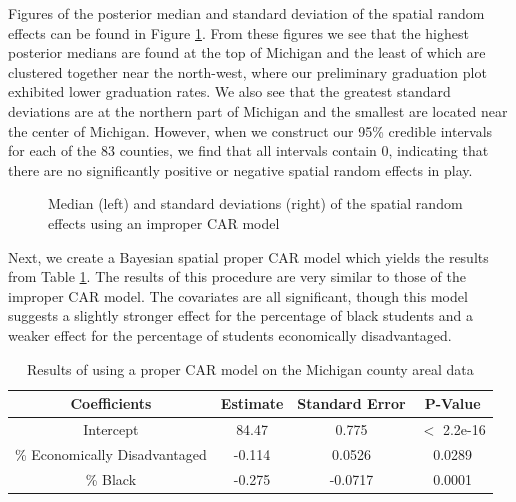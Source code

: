 \documentclass[12pt,letterpaper]{article}
\begin{document}
Figures of the posterior median and standard deviation of the spatial random effects can be found in Figure \ref{lab:med_sd}. From these figures we see that the highest posterior medians are found at the top of Michigan and the least of which are clustered together near the north-west, where our preliminary graduation plot exhibited lower graduation rates. We also see that the greatest standard deviations are at the northern part of Michigan and the smallest are located near the center of Michigan. However, when we construct our 95\% credible intervals for each of the 83 counties, we find that all intervals contain 0, indicating that there are no significantly positive or negative spatial random effects in play.

\begin{figure}[h!]
\caption{Median (left) and standard deviations (right) of the spatial random effects using an improper CAR model}
\centering
\begin{minipage}{.5\textwidth}
  \centering
  \scalebox{.81}{
 \trimbox{1cm 2cm 0cm 0cm}{}
 }
\end{minipage}%
\begin{minipage}{.5\textwidth}
  \centering
  \scalebox{.81}{
 \trimbox{0cm 2cm -1cm 0cm}{}
 }
\end{minipage}

\label{lab:med_sd}
\end{figure}


Next, we create a Bayesian spatial proper CAR model which yields the results from Table \ref{tab:proper_car}. The results of this procedure are very similar to those of the improper CAR model. The covariates are all significant, though this model suggests a slightly stronger effect for the percentage of black students and a weaker effect for the percentage of students economically disadvantaged. 

\begin{table}
  \caption{Results of using a proper CAR model on the Michigan county areal data} 
  \label{tab:proper_car}
  \centering 
 \begin{tabular}{||c c c c||} 
 \hline
 Coefficients & Estimate & Standard Error & P-Value\\ [0.5ex] 
 \hline\hline
 Intercept & 84.47 & 0.775 & $<$ 2.2e-16 \\ 
 \hline
 \% Economically Disadvantaged & -0.114 & 0.0526  & 0.0289 \\
 \hline
 \% Black & -0.275 & -0.0717 & 0.0001 \\[0.5ex] 
 \hline
\end{tabular}
\end{table}
\end{document}

